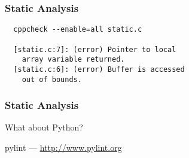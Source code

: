 \begin{frame}[fragile]
  \frametitle{Static Analysis}
  \begin{example}
    \begin{verbatim}
  cppcheck --enable=all static.c

  [static.c:7]: (error) Pointer to local
    array variable returned.
  [static.c:6]: (error) Buffer is accessed
    out of bounds.
    \end{verbatim}
  \end{example}
\end{frame}

\begin{frame}
  \frametitle{Static Analysis}
  {\Large\color{Base09}What about Python?}

  \vspace{1cm}
  pylint    --- {\color{Base0D}\url{http://www.pylint.org}}
\end{frame}
